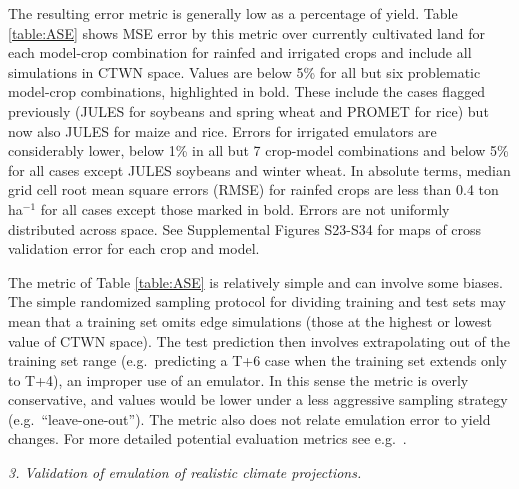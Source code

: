 \documentclass[gmd, manuscript]{copernicus} %
\begin{document}
The resulting error metric is generally low as a percentage of yield.
Table \ref{table:ASE} shows MSE error by this metric over currently cultivated land for each model-crop combination for rainfed and irrigated crops and include all simulations in CTWN space. 
Values are below 5\% for all but six problematic model-crop combinations, highlighted in bold. 
These include the cases flagged previously (JULES for soybeans and spring wheat and PROMET for rice) but now also JULES for maize and rice.
Errors for irrigated emulators are considerably lower, below 1\% in all but 7 crop-model combinations and below 5\% for all cases except JULES soybeans and winter wheat.
In absolute terms, median grid cell root mean square errors (RMSE) for rainfed crops are less than 0.4 ton ha$^{-1}$ for all cases except those marked in bold.
Errors are not uniformly distributed across space. 
See Supplemental Figures S23-S34 for maps of cross validation error for each crop and model.

The metric of Table \ref{table:ASE} is relatively simple and can involve some biases. %
The simple randomized sampling protocol for dividing training and test sets may mean that a training set omits edge simulations (those at the highest or lowest value of CTWN space). 
The test prediction then involves extrapolating out of the training set range (e.g.\ predicting a T+6 case when the training set extends only to T+4), an improper use of an emulator.
In this sense the metric is overly conservative, and values would be lower under a less aggressive sampling strategy (e.g.\ ``leave-one-out''). 
The metric also does not relate emulation error to yield changes. For more detailed potential evaluation metrics see e.g.\ \citet{Castruccio14}.

\smallskip
\textit{3. Validation of emulation of realistic climate projections.}
\label{S:4.3}
\end{document}
